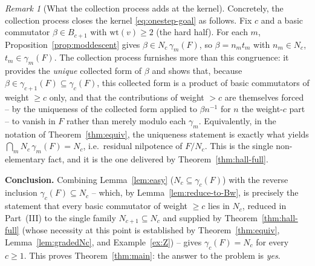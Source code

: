 \documentclass{amsart}
\theoremstyle{definition}
\theoremstyle{remark}
\newtheorem{remark}{Remark}
\begin{document}
\begin{remark}[What the collection process adds at the kernel]\label{rem:collection}
Concretely, the collection process closes the kernel \eqref{eq:onestep-goal} as
follows. Fix $c$ and a basic commutator $\beta\in B_{c+1}$ with
$\mathrm{wt}(v)\ge2$ (the hard half). For each $m$, Proposition~\ref{prop:moddescent}
gives $\beta\in N_c\,\gamma_m(F)$, so $\beta=n_m t_m$ with $n_m\in N_c$,
$t_m\in\gamma_m(F)$. The collection process furnishes more than this congruence: it
provides the \emph{unique} collected form of $\beta$ and shows that, because
$\beta\in\gamma_{c+1}(F)\subseteq\gamma_c(F)$, this collected form is a product of
basic commutators of weight $\ge c$ only, and that the contributions of weight
$>c$ are themselves forced -- by the uniqueness of the collected form applied to
$\beta n^{-1}$ for $n$ the weight-$c$ part -- to vanish in $F$ rather than merely
modulo each $\gamma_m$. Equivalently, in the notation of
Theorem~\ref{thm:equiv}, the uniqueness statement is exactly what yields
$\bigcap_{m}N_c\,\gamma_m(F)=N_c$, i.e.\ residual nilpotence of $F/N_c$. This is the
single non-elementary fact, and it is the one delivered by
Theorem~\ref{thm:hall-full}.
\end{remark}

\bigskip
\noindent\textbf{Conclusion.}
Combining Lemma~\ref{lem:easy} ($N_c\subseteq\gamma_c(F)$) with the reverse
inclusion $\gamma_c(F)\subseteq N_c$ -- which, by
Lemma~\ref{lem:reduce-to-Bw}, is precisely the statement that every basic
commutator of weight $\ge c$ lies in $N_c$, reduced in Part~(III) to the single
family $N_{c+1}\subseteq N_c$ and supplied by Theorem~\ref{thm:hall-full} (whose
necessity at this point is established by Theorem~\ref{thm:equiv},
Lemma~\ref{lem:gradedNc}, and Example~\ref{ex:Z}) -- gives
$\gamma_c(F)=N_c$ for every $c\ge1$. This proves Theorem~\ref{thm:main}: the answer
to the problem is \emph{yes}.
\end{document}
